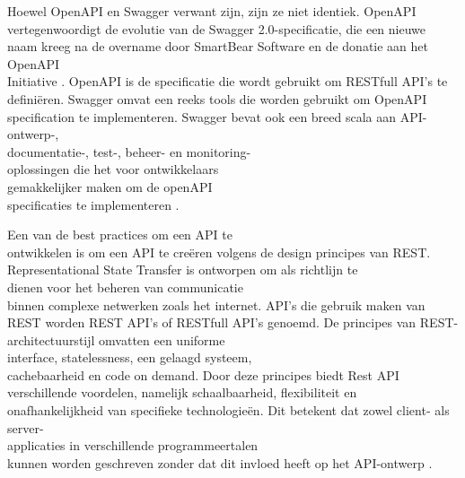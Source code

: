 Hoewel OpenAPI en Swagger verwant zijn, zijn ze niet identiek. OpenAPI vertegenwoordigt de evolutie van de Swagger 2.0-specificatie, die een nieuwe naam kreeg na de overname door SmartBear Software en de donatie aan het OpenAPI \\Initiative \autocite{2023}. OpenAPI is de specificatie die wordt gebruikt om RESTfull API's te definiëren. Swagger omvat een reeks tools die worden gebruikt om OpenAPI \\specification te implementeren. Swagger bevat ook een breed scala aan API-ontwerp-, \\documentatie-, test-, beheer- en monitoring-\\oplossingen die het voor ontwikkelaars \\gemakkelijker maken om de openAPI \\specificaties te implementeren \autocite{ Pinkham2017}. 

Een van de best practices om een API te \\ontwikkelen is om een API te creëren volgens de design principes van REST. Representational State Transfer is ontworpen om als richtlijn te \\dienen voor het beheren van communicatie \\binnen complexe netwerken zoals het internet. API’s die gebruik maken van REST worden REST API’s of RESTfull API’s genoemd. De principes van REST-architectuurstijl omvatten een uniforme \\interface, statelessness, een gelaagd systeem, \\cachebaarheid en code on demand. Door deze principes biedt Rest API verschillende voordelen, namelijk schaalbaarheid, flexibiliteit en \\onafhankelijkheid van specifieke technologieën. Dit betekent dat zowel client- als server-\\applicaties in verschillende programmeertalen \\kunnen worden geschreven zonder dat dit invloed heeft op het API-ontwerp \autocite{2020}. 

